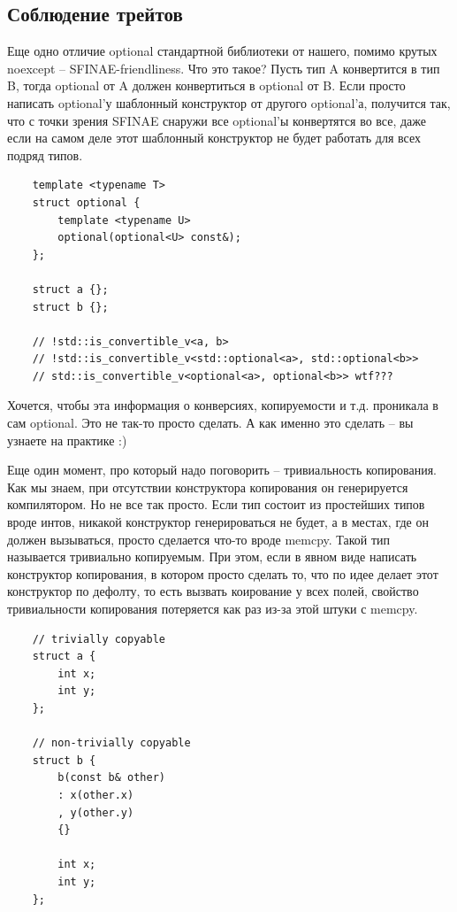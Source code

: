 \documentclass[12pt, a4paper]{article}
\begin{document}
\subsection{Соблюдение трейтов}
Еще одно отличие optional стандартной библиотеки от нашего, помимо крутых noexcept -- SFINAE-friendliness. Что это такое? Пусть тип A конвертится в тип B, тогда optional от A должен конвертиться в optional от B. Если просто написать optional'у шаблонный конструктор от другого optional'а, получится так, что с точки зрения SFINAE снаружи все optional'ы конвертятся во все, даже если на самом деле этот шаблонный конструктор не будет работать для всех подряд типов.
\begin{verbatim}
	template <typename T>
	struct optional {
		template <typename U>
		optional(optional<U> const&);
	};
	
	struct a {};
	struct b {};
	
	// !std::is_convertible_v<a, b>
	// !std::is_convertible_v<std::optional<a>, std::optional<b>>
	// std::is_convertible_v<optional<a>, optional<b>> wtf???
\end{verbatim}
Хочется, чтобы эта информация о конверсиях, копируемости и т.д. проникала в сам optional. Это не так-то просто сделать. А как именно это сделать -- вы узнаете на практике :)
\\\par Еще один момент, про который надо поговорить -- тривиальность копирования. Как мы знаем, при отсутствии конструктора копирования он генерируется компилятором. Но не все так просто. Если тип состоит из простейших типов вроде интов, никакой конструктор генерироваться не будет, а в местах, где он должен вызываться, просто сделается что-то вроде memcpy. Такой тип называется тривиально копируемым. При этом, если в явном виде написать конструктор копирования, в котором просто сделать то, что по идее делает этот конструктор по дефолту, то есть вызвать коирование у всех полей, свойство тривиальности копирования потеряется как раз из-за этой штуки с memcpy.
\begin{verbatim}
	// trivially copyable
	struct a {
		int x;
		int y;
	};
	
	// non-trivially copyable
	struct b {
		b(const b& other)
		: x(other.x)
		, y(other.y)
		{}
		
		int x;
		int y;
	};
\end{verbatim}
\end{document}
